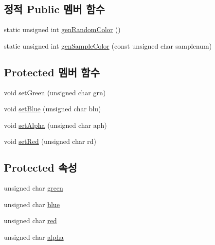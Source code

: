 \subsection*{정적 Public 멤버 함수}
\begin{DoxyCompactItemize}
\item 
static unsigned int \hyperlink{class_tetris_1_1_block_sub_modules_1_1_block_color_a74374a6d24cd77c7f4fe03e19111bab7}{gen\+Random\+Color} ()
\item 
static unsigned int \hyperlink{class_tetris_1_1_block_sub_modules_1_1_block_color_a624fe688c2889c345cb8dff757f06ef9}{gen\+Sample\+Color} (const unsigned char samplenum)
\end{DoxyCompactItemize}
\subsection*{Protected 멤버 함수}
\begin{DoxyCompactItemize}
\item 
void \hyperlink{class_tetris_1_1_block_sub_modules_1_1_block_color_aeea8ab6d5f36d35fd4f28818349661ab}{set\+Green} (unsigned char grn)
\item 
void \hyperlink{class_tetris_1_1_block_sub_modules_1_1_block_color_ac624156bd1f77a20d6e1d4c8cbff36d3}{set\+Blue} (unsigned char blu)
\item 
void \hyperlink{class_tetris_1_1_block_sub_modules_1_1_block_color_a5fdd2d1a53d92ec0bcc1c25748b890e0}{set\+Alpha} (unsigned char aph)
\item 
void \hyperlink{class_tetris_1_1_block_sub_modules_1_1_block_color_a9541e6b5b809214ae2691a99af06ac3f}{set\+Red} (unsigned char rd)
\end{DoxyCompactItemize}
\subsection*{Protected 속성}
\begin{DoxyCompactItemize}
\item 
unsigned char \hyperlink{class_tetris_1_1_block_sub_modules_1_1_block_color_a4b28885bfd8bf53793c6b3daedd974eb}{green}
\item 
unsigned char \hyperlink{class_tetris_1_1_block_sub_modules_1_1_block_color_af04e78b9a1c2f7625863c289c4a741e3}{blue}
\item 
unsigned char \hyperlink{class_tetris_1_1_block_sub_modules_1_1_block_color_af8a0dc372e7dbab300290eadada8ef49}{red}
\item 
unsigned char \hyperlink{class_tetris_1_1_block_sub_modules_1_1_block_color_af0983ea684f33617a0b482cfea1d3c2b}{alpha}
\end{DoxyCompactItemize}
